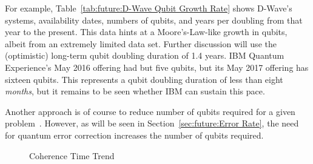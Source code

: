 For example, Table~\ref{tab:future:D-Wave Qubit Growth Rate} shows D-Wave's systems,
availability dates, numbers of qubits, and years per doubling
from that year to the present.
This data hints at a Moore's-Law-like growth in qubits, albeit from
an extremely limited data set.
Further discussion will use the (optimistic) long-term qubit
doubling duration of 1.4 years.
IBM Quantum Experience's May 2016 offering had but five qubits, but its
May 2017 offering has sixteen qubits.
This represents a qubit doubling duration of less than eight \emph{months},
but it remains to be seen whether IBM can sustain this pace.

Another approach is of course to reduce number of qubits required for a
given problem~\cite{SergeyBravyi2017-QC-SimulateFermionicHamiltonians}.
However, as will be seen in Section~\ref{sec:future:Error Rate}, the need for
quantum error correction increases the number of qubits required.

\begin{figure}[tb]
\centering
{}
\caption{Coherence Time Trend}
\label{fig:future:Coherence Time Trend}
\end{figure}

